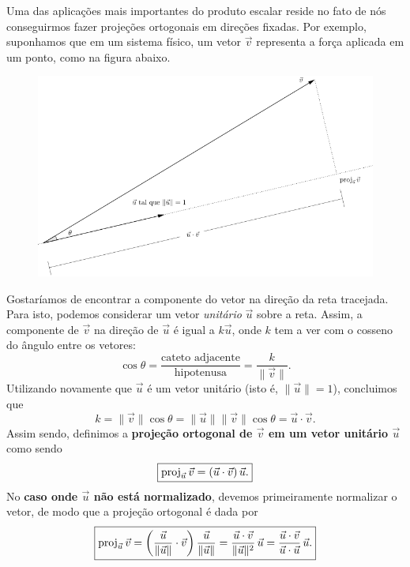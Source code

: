Uma das aplicações mais importantes do produto escalar reside no fato de nós conseguirmos fazer projeções ortogonais em direções fixadas. Por exemplo, suponhamos que em um sistema físico, um vetor $\vec{v}$ representa a força aplicada em um ponto, como na figura abaixo.
\begin{figure}[h!]
	\begin{center}
		\includegraphics[width=1\linewidth]{Semana11/semana11-proj}
	\end{center}
\end{figure} Gostaríamos de encontrar a componente do vetor na direção da reta tracejada. Para isto, podemos considerar um vetor \textit{unitário} $\vec{u}$ sobre a reta. Assim, a componente de $\vec{v}$ na direção de $\vec{u}$ é igual a $k \vec{u}$, onde $k$ tem a ver com o cosseno do ângulo entre os vetores:
\begin{equation}
\cos \theta = \frac{\text{cateto adjacente}}{\text{hipotenusa}} = \frac{k}{\|\vec{v}\|}.
\end{equation} Utilizando novamente que $\vec{u}$ é um vetor unitário (isto é, $\|\vec{u}\|=1$), concluimos que
\begin{equation}
k = \|\vec{v}\| \cos \theta = \|\vec{u}\| \|\vec{v}\| \cos \theta = \vec{u} \cdot \vec{v}.
\end{equation} Assim sendo, definimos a \textbf{projeção ortogonal de $\vec{v}$ em um vetor unitário $\vec{u}$} como sendo
\begin{equation}
\boxed{\operatorname{proj}_{\vec{u}} \vec{v} = (\vec{u} \cdot \vec{v}) \, \vec{u}.}
\end{equation} No \textbf{caso onde $\vec{u}$ não está normalizado}, devemos primeiramente normalizar o vetor, de modo que a projeção ortogonal é dada por
\begin{equation}
\boxed{\operatorname{proj}_{\vec{u}} \vec{v} = \bigg( \frac{\vec{u}}{\|\vec{u}\|} \cdot \vec{v} \bigg) \, \frac{\vec{u}}{\|\vec{u}\|} = \frac{\vec{u} \cdot \vec{v}}{\|\vec{u}\|^2} \, \vec{u} = \frac{\vec{u} \cdot \vec{v}}{\vec{u} \cdot \vec{u}} \, \vec{u}.}
\end{equation}

